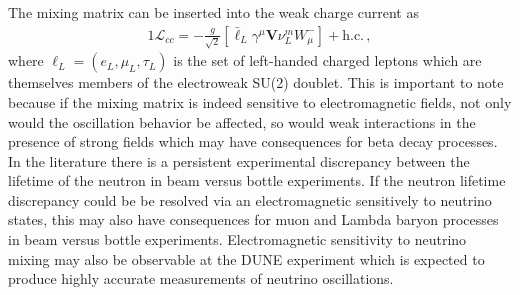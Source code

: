 The mixing matrix can be inserted into the weak charge current as
\begin{alignat}{1}
	\label{pmns:eq:05} \mathcal{L}_{cc} = -\frac{g}{\sqrt{2}}\left[\bar{\ell}_{L}\gamma^{\mu}\mathbf{V}\nu^{m}_{L}W^{-}_{\mu}\right]+\mathrm{h.c.}\,,
\end{alignat}
where $\ell_{L} = (e_{L}, \mu_{L}, \tau_{L})$ is the set of left-handed charged leptons which are themselves members of the electroweak SU(2) doublet. This is important to note because if the mixing matrix is indeed sensitive to electromagnetic fields, not only would the oscillation behavior be affected, so would  weak interactions in the presence of strong fields which may have consequences for beta decay processes. In the literature there is a persistent experimental discrepancy between the lifetime of the neutron in beam versus bottle experiments. If the neutron lifetime discrepancy could be be resolved via an electromagnetic sensitively to neutrino states, this may also have consequences for muon and Lambda baryon processes in beam versus bottle experiments. Electromagnetic sensitivity to neutrino mixing may also be observable at the DUNE experiment which is expected to produce highly accurate measurements of neutrino oscillations.

